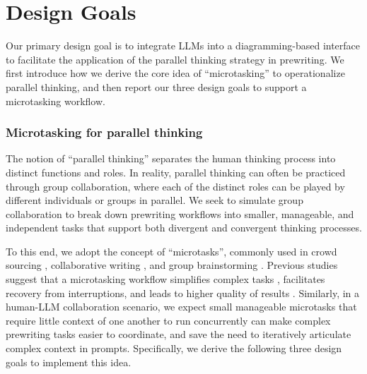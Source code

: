 \section{Design Goals}
Our primary design goal is to integrate LLMs into a diagramming-based interface to facilitate the application of the parallel thinking strategy in prewriting. We first introduce how we derive the core idea of ``microtasking'' to operationalize parallel thinking, and then report our three design goals to support a microtasking workflow.

\subsubsection*{\textbf{Microtasking for parallel thinking}}
The notion of ``parallel thinking'' separates the human thinking process into distinct functions and roles. 
In reality, parallel thinking can often be practiced through group collaboration, where each of the distinct roles can be played by different individuals or groups in parallel. We seek to simulate group collaboration to break down prewriting workflows into smaller, manageable, and independent tasks that support both divergent and convergent thinking processes.

To this end, we adopt the concept of ``microtasks'', commonly used in crowd sourcing \cite{latoza2014microtask,chen2017retool}, collaborative writing \cite{iqbal2018multitasking,birnholtz2013write,teevan2016supporting}, and group brainstorming \cite{chilton2019visiblends,teevan2016supporting}. Previous studies suggest that a microtasking workflow simplifies complex tasks \cite{cheng2015break,kokkalis2013taskgenies}, facilitates recovery from interruptions, and leads to higher quality of results \cite{cheng2015break}. Similarly, in a human-LLM collaboration scenario, we expect small manageable microtasks that require little context of one another to run concurrently can make complex prewriting tasks easier to coordinate, and save the need to iteratively articulate complex context in prompts.
Specifically, we derive the following three design goals to implement this idea. 

